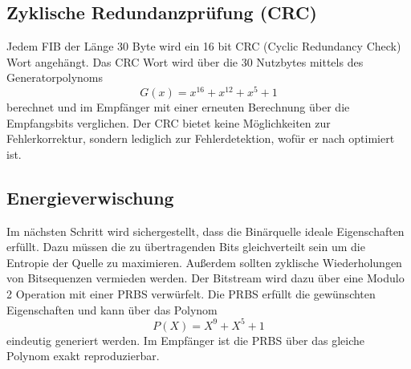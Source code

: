 \subsection{Zyklische Redundanzprüfung (CRC)}
\label{sec:crc}
Jedem \ac{FIB} der Länge 30 Byte wird ein 16 bit CRC (Cyclic Redundancy Check) Wort angehängt. Das CRC Wort wird über die 30 Nutzbytes mittels des Generatorpolynoms
\begin{equation}
G(x) = x^{16} + x^{12} + x^5 + 1
\end{equation}
berechnet und im Empfänger mit einer erneuten Berechnung über die Empfangsbits verglichen. Der CRC bietet keine Möglichkeiten zur Fehlerkorrektur, sondern lediglich zur Fehlerdetektion, wofür er nach \cite{crc:recommendation} optimiert ist.

\subsection{Energieverwischung}
\label{sec:energieverwischung}
Im nächsten Schritt wird sichergestellt, dass die Binärquelle ideale Eigenschaften erfüllt. Dazu müssen die zu übertragenden Bits gleichverteilt sein um die Entropie der Quelle zu maximieren. Außerdem sollten zyklische Wiederholungen von Bitsequenzen vermieden werden. Der Bitstream wird dazu über eine Modulo 2 Operation mit einer \ac{PRBS} verwürfelt. Die \ac{PRBS} erfüllt die gewünschten Eigenschaften und kann über das Polynom
\begin{equation}
\label{eq:energy_dispersal}
P(X) = X^9 + X^5 + 1
\end{equation}
eindeutig generiert werden. Im Empfänger ist die PRBS über das gleiche Polynom exakt reproduzierbar.

